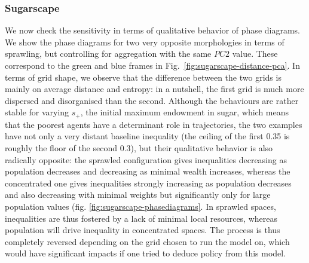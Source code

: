 \documentclass{JASSS}
\begin{document}
\subsubsection{Sugarscape}

We now check the sensitivity in terms of qualitative behavior of phase diagrams. We show the phase diagrams for two very opposite morphologies in terms of sprawling, but controlling for aggregation with the same $PC2$ value. These correspond to the green and blue frames in Fig.~\ref{fig:sugarscape-distance-pca}. In terms of grid shape, we observe that the difference between the two grids is mainly on average distance and entropy: in a nutshell, the first grid is much more dispersed and disorganised than the second. Although the behaviours are rather stable for varying $s_+$, the initial maximum endowment in sugar, which means that the poorest agents have a determinant role in trajectories, the two examples have not only a very distant baseline inequality (the ceiling of the first 0.35 is roughly the floor of the second 0.3), but their qualitative behavior is also radically opposite: the sprawled configuration gives inequalities decreasing as population decreases and decreasing as minimal wealth increases, whereas the concentrated one gives inequalities strongly increasing as population decreases and also decreasing with minimal weights but significantly only for large population values (fig. \ref{fig:sugarscape-phasediagrams}. In sprawled spaces, inequalities are thus fostered by a lack of minimal local resources, whereas population will drive inequality in concentrated spaces. The process is thus completely reversed depending on the grid chosen to run the model on, which would have significant impacts if one tried to deduce policy from this model.


\end{document}
